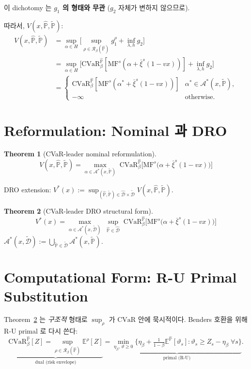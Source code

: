 \documentclass[11pt]{article}
\newcommand{\E}{\mathbb{E}}
\newcommand{\Phat}{\hat{\mathbb{P}}}
\newcommand{\Ptil}{\tilde{\mathbb{P}}}
\newcommand{\Dhat}{\hat{\mathcal{D}}}
\newcommand{\Dtil}{\tilde{\mathcal{D}}}
\newcommand{\barxi}{\bar{\xi}}
\newcommand{\MF}{\mathrm{MF}}
\newcommand{\CVaR}{\mathrm{CVaR}}
\newcommand{\Rb}{\mathcal{R}_\beta}
\theoremstyle{plain}
\newtheorem{theorem}{Theorem}
\theoremstyle{remark}
\begin{document}
이 dichotomy 는 \textbf{$g_1$ 의 형태와 무관} ($g_2$ 자체가 변하지 않으므로).

따라서, $V(x,\Phat, \Ptil)$:
\begin{align*}
V(x,\Phat, \Ptil)
&= \sup_{\alpha \in H}\Big[\sup_{\rho \in \Rb(\Phat)} g_1^\rho + \inf_{\lambda, h} g_2\Big]\\
&= \sup_{\alpha \in H}\Big[\CVaR_\beta^{\Phat}[\MF^s(\alpha+\barxi^s(1-vx))] + \inf_{\lambda, h} g_2\Big]\\
&= \begin{cases}
\CVaR_\beta^{\Phat}[\MF^s(\alpha^* +\barxi^s(1-vx))] & \alpha^* \in \mathcal{A}^*(x,\Ptil),\\
-\infty & \text{otherwise}.
\end{cases}
\end{align*}


\section{Reformulation: Nominal 과 DRO}
\label{sec:reformulation}

\begin{theorem}[CVaR-leader nominal reformulation]\label{thm:nominal}
\[
\boxed{\;
V(x, \Phat, \Ptil) = \max_{\alpha \in \mathcal{A}^*(x, \Ptil)}\; \CVaR_\beta^{\Phat}\!\Big[\MF^s\big(\alpha + \barxi^s(1-vx)\big)\Big]\;}
\]
\end{theorem}

DRO extension: $V^*(x) := \sup_{(\Phat, \Ptil) \in \Dhat \times \Dtil} V(x, \Phat, \Ptil)$.

\begin{theorem}[CVaR-leader DRO structural form]\label{thm:dro}
\[
\boxed{\;
V^*(x) = \max_{\alpha \in \mathcal{A}^*(x, \Dtil)}\; \sup_{\Phat \in \Dhat}\; \CVaR_\beta^{\Phat}\!\Big[\MF^s\big(\alpha + \barxi^s(1-vx)\big)\Big]\;}
\]
$\mathcal{A}^*(x, \Dtil) := \bigcup_{\Ptil \in \Dtil} \mathcal{A}^*(x, \Ptil)$.
\end{theorem}


\section{Computational Form: R-U Primal Substitution}
\label{sec:comp-form}

Theorem~\ref{thm:dro} 는 \emph{구조적} 형태로 $\sup_\rho$ 가 $\CVaR$ 안에 묵시적이다. Benders 호환을 위해 R-U primal 로 다시 쓴다:
\[
\underbrace{\CVaR_\beta^{\Phat}[Z] = \sup_{\rho \in \Rb(\Phat)}\E^\rho[Z]}_{\text{dual (risk envelope)}}
=\underbrace{\min_{\eta_\beta,\, \vartheta \geq 0}\Big\{\eta_\beta + \tfrac{1}{1-\beta}\E^{\Phat}[\vartheta_s] : \vartheta_s \geq Z_s - \eta_\beta\;\forall s\Big\}}_{\text{primal (R-U)}}.
\]
\end{document}
